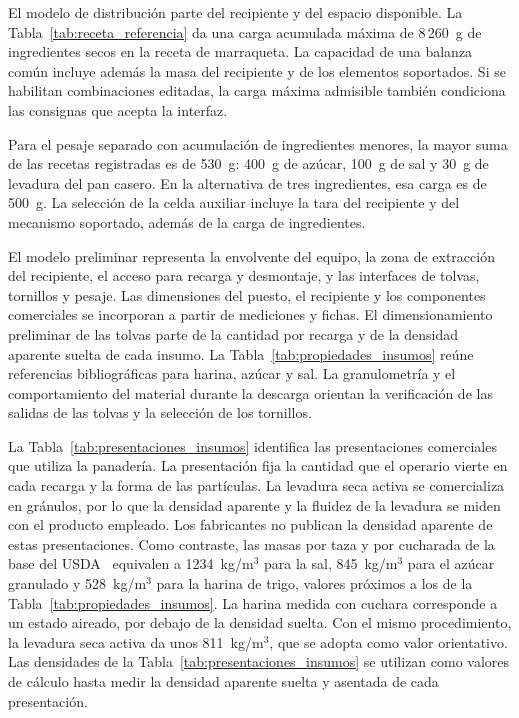 El modelo de distribución parte del recipiente y del espacio disponible. La
Tabla~\ref{tab:receta_referencia} da una carga acumulada máxima de
8\,260~g de ingredientes secos en la receta de marraqueta. La capacidad
de una balanza común incluye además la masa del recipiente y de los elementos
soportados. Si se habilitan combinaciones editadas, la carga máxima
admisible también condiciona las consignas que acepta la interfaz.

Para el pesaje separado con acumulación de ingredientes menores, la
mayor suma de las recetas registradas es de 530~g: 400~g de azúcar,
100~g de sal y 30~g de levadura del pan casero. En la alternativa de
tres ingredientes, esa carga es de 500~g. La selección de la celda
auxiliar incluye la tara del recipiente y del mecanismo soportado,
además de la carga de ingredientes.

El modelo preliminar representa la envolvente del equipo, la zona de
extracción del recipiente, el acceso para recarga y desmontaje, y las interfaces
de tolvas, tornillos y pesaje. Las dimensiones del puesto, el recipiente y los
componentes comerciales se incorporan a partir de mediciones y fichas.
El dimensionamiento preliminar de las tolvas parte de la cantidad por
recarga y de la densidad aparente suelta de cada insumo. La
Tabla~\ref{tab:propiedades_insumos} reúne referencias bibliográficas para
harina, azúcar y sal. La granulometría y el comportamiento
del material durante la descarga orientan la verificación de las salidas
de las tolvas y la selección de los tornillos.

La Tabla~\ref{tab:presentaciones_insumos} identifica las presentaciones
comerciales que utiliza la panadería. La presentación fija la cantidad que
el operario vierte en cada recarga y la forma de las partículas. La
levadura seca activa se comercializa en gránulos, por lo que la densidad
aparente y la fluidez de la levadura se miden con el producto empleado.
Los fabricantes no publican la densidad aparente de estas presentaciones.
Como contraste, las masas por taza y por cucharada de la base del
USDA~\parencite{usda2019fdc} equivalen a 1234~kg/m$^{3}$ para la sal, 845~kg/m$^{3}$
para el azúcar granulado y 528~kg/m$^{3}$ para la harina de trigo, valores
próximos a los de la Tabla~\ref{tab:propiedades_insumos}. La harina medida
con cuchara corresponde a un estado aireado, por debajo de la densidad
suelta. Con el mismo procedimiento, la levadura seca activa da unos
811~kg/m$^{3}$, que se adopta como valor orientativo. Las densidades de la
Tabla~\ref{tab:presentaciones_insumos} se utilizan como valores de cálculo
hasta medir la densidad aparente suelta y asentada de cada presentación.

